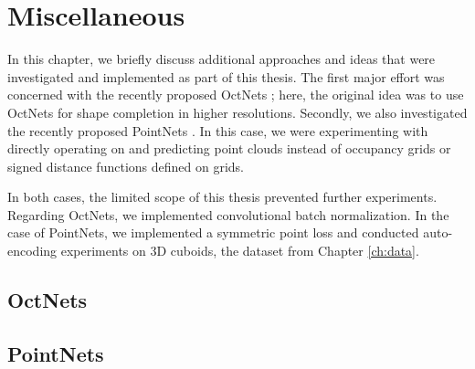 \chapter{Miscellaneous}

In this chapter, we briefly discuss additional approaches and ideas that
were investigated and implemented as part of this thesis. The first major
effort was concerned with the recently proposed OctNets \cite{RieglerGeiger:2016,
RieglerGeiger:2017}; here, the original idea was to use OctNets for shape
completion in higher resolutions. Secondly, we also investigated the
recently proposed PointNets \cite{QiSuGuibas:2016a,FanSuGuibas:2016,QiYiSuGuibas:2017}.
In this case, we were experimenting with directly operating on and predicting
point clouds instead of occupancy grids or signed distance functions defined
on grids.

In both cases, the limited scope of this thesis prevented further experiments.
Regarding OctNets, we implemented convolutional batch normalization. In the case
of PointNets, we implemented a symmetric point loss and conducted auto-encoding
experiments on 3D cuboids, the \Cub dataset from Chapter \ref{ch:data}.

\section{OctNets}



\section{PointNets}


